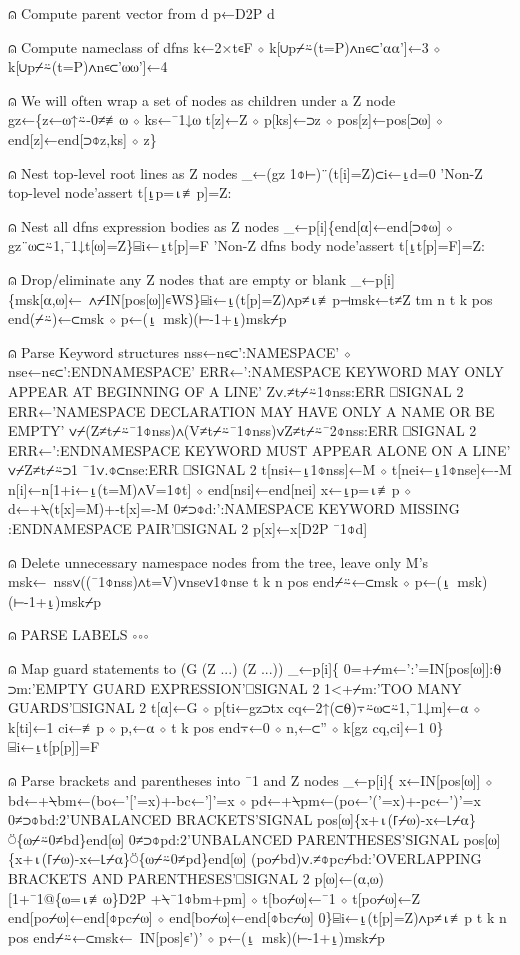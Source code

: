 \documentclass{article}%
\begin{document}
⍝ Compute parent vector from d
         p←D2P d

⍝ Compute nameclass of dfns
         k←2×t∊F ⋄ k[∪p⌿⍨(t=P)∧n∊⊂'⍺⍺']←3 ⋄ k[∪p⌿⍨(t=P)∧n∊⊂'⍵⍵']←4

⍝ We will often wrap a set of nodes as children under a Z node
         gz←\{z←⍵↑⍨-0≠≢⍵ ⋄ ks←¯1↓⍵
                 t[z]←Z ⋄ p[ks]←⊃z ⋄ pos[z]←pos[⊃⍵] ⋄ end[z]←end[⊃⌽z,ks] ⋄ z\}

⍝ Nest top-level root lines as Z nodes
         _←(gz 1⌽⊢)¨(t[i]=Z)⊂i←⍸d=0
         'Non-Z top-level node'assert t[⍸p=⍳≢p]=Z:

⍝ Nest all dfns expression bodies as Z nodes
         _←p[i]\{end[⍺]←end[⊃⌽⍵] ⋄ gz¨⍵⊂⍨1,¯1↓t[⍵]=Z\}⌸i←⍸t[p]=F
         'Non-Z dfns body node'assert t[⍸t[p]=F]=Z:

⍝ Drop/eliminate any Z nodes that are empty or blank
         _←p[i]\{msk[⍺,⍵]←~∧⌿IN[pos[⍵]]∊WS\}⌸i←⍸(t[p]=Z)∧p≠⍳≢p⊣msk←t≠Z
         tm n t k pos end(⌿⍨)←⊂msk ⋄ p←(⍸~msk)(⊢-1+⍸)msk⌿p

⍝ Parse Keyword structures
         nss←n∊⊂':NAMESPACE' ⋄ nse←n∊⊂':ENDNAMESPACE'
         ERR←':NAMESPACE KEYWORD MAY ONLY APPEAR AT BEGINNING OF A LINE'
         Z∨.≠t⌿⍨1⌽nss:ERR ⎕SIGNAL 2
         ERR←'NAMESPACE DECLARATION MAY HAVE ONLY A NAME OR BE EMPTY'
         ∨⌿(Z≠t⌿⍨¯1⌽nss)∧(V≠t⌿⍨¯1⌽nss)∨Z≠t⌿⍨¯2⌽nss:ERR ⎕SIGNAL 2
         ERR←':ENDNAMESPACE KEYWORD MUST APPEAR ALONE ON A LINE'
         ∨⌿Z≠t⌿⍨⊃1 ¯1∨.⌽⊂nse:ERR ⎕SIGNAL 2
         t[nsi←⍸1⌽nss]←M ⋄ t[nei←⍸1⌽nse]←-M
         n[i]←n[1+i←⍸(t=M)∧V=1⌽t] ⋄ end[nsi]←end[nei]
         x←⍸p=⍳≢p ⋄ d←+⍀(t[x]=M)+-t[x]=-M
         0≠⊃⌽d:':NAMESPACE KEYWORD MISSING :ENDNAMESPACE PAIR'⎕SIGNAL 2
         p[x]←x[D2P ¯1⌽d]

⍝ Delete unnecessary namespace nodes from the tree, leave only M's
         msk←~nss∨((¯1⌽nss)∧t=V)∨nse∨1⌽nse
         t k n pos end⌿⍨←⊂msk ⋄ p←(⍸~msk)(⊢-1+⍸)msk⌿p

⍝ PARSE LABELS ∘∘∘

⍝ Map guard statements to (G (Z ...) (Z ...))
         _←p[i]\{
                 0=+⌿m←':'=IN[pos[⍵]]:⍬
                 ⊃m:'EMPTY GUARD  EXPRESSION'⎕SIGNAL 2
                 1<+⌿m:'TOO MANY GUARDS'⎕SIGNAL 2
                 t[⍺]←G ⋄ p[ti←gz⊃tx cq←2↑(⊂⍬)⍪⍨⍵⊂⍨1,¯1↓m]←⍺ ⋄ k[ti]←1
                 ci←≢p ⋄ p,←⍺ ⋄ t k pos end⍪←0 ⋄ n,←⊂'' ⋄ k[gz cq,ci]←1
         0\}⌸i←⍸t[p[p]]=F

⍝ Parse brackets and parentheses into ¯1 and Z nodes
         _←p[i]\{
                 x←IN[pos[⍵]] ⋄ bd←+⍀bm←(bo←'['=x)+-bc←']'=x ⋄ pd←+⍀pm←(po←'('=x)+-pc←')'=x
                 0≠⊃⌽bd:2'UNBALANCED BRACKETS'SIGNAL pos[⍵]\{x+⍳(⌈⌿⍵)-x←⌊⌿⍺\}⍥\{⍵⌿⍨0≠bd\}end[⍵]
                 0≠⊃⌽pd:2'UNBALANCED PARENTHESES'SIGNAL pos[⍵]\{x+⍳(⌈⌿⍵)-x←⌊⌿⍺\}⍥\{⍵⌿⍨0≠pd\}end[⍵]
                 (po⌿bd)∨.≠⌽pc⌿bd:'OVERLAPPING BRACKETS AND PARENTHESES'⎕SIGNAL 2
                 p[⍵]←(⍺,⍵)[1+¯1@\{⍵=⍳≢⍵\}D2P +⍀¯1⌽bm+pm] ⋄ t[bo⌿⍵]←¯1 ⋄ t[po⌿⍵]←Z
                 end[po⌿⍵]←end[⌽pc⌿⍵] ⋄ end[bo⌿⍵]←end[⌽bc⌿⍵]
         0\}⌸i←⍸(t[p]=Z)∧p≠⍳≢p
         t k n pos end⌿⍨←⊂msk←~IN[pos]∊')' ⋄ p←(⍸~msk)(⊢-1+⍸)msk⌿p
\end{document}
